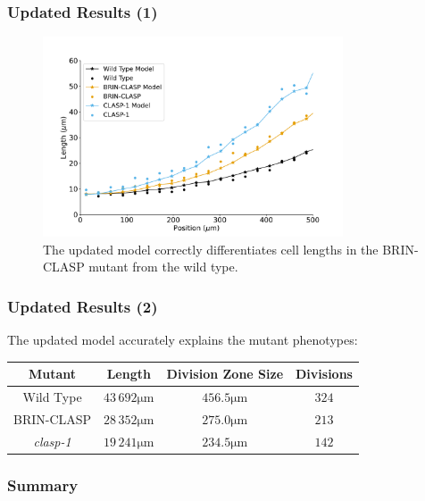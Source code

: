 \documentclass{beamer}
\newcommand{\um}{\unit{\micro\metre}}
\begin{document}
\begin{frame}
\frametitle{Updated Results (1)}
\begin{figure}
  \centering
  \includegraphics[height=16em]{column-modified-fit.pdf}
  \caption{The updated model correctly differentiates cell lengths in the BRIN-CLASP mutant from the wild type.}
\end{figure}
\end{frame}

\begin{frame}
\frametitle{Updated Results (2)}
The updated model accurately explains the mutant phenotypes:
\begin{center}
\medskip
\begin{tabular}{|c c c c |} 
 \hline
 Mutant & Length & Division Zone Size & Divisions  \\ [0.5ex] 
 \hline
 Wild Type & $43\,692\um$ &  $456.5\um$ & $324$ \\ 
 \hline
 BRIN-CLASP & $28\,352\um$ &  $275.0\um$ & $213$ \\
 \hline
 \emph{clasp-1} & $19\,241\um$ &  $234.5\um$ & $142$ \\
 \hline
\end{tabular}
\end{center}
\end{frame}

\begin{frame}
\frametitle{Summary}


\bigskip


\end{frame}
\end{document}

